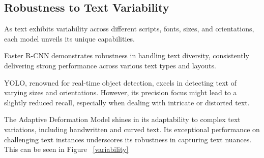 \subsection{Robustness to Text Variability} 
As text exhibits variability across different scripts, fonts, sizes, and orientations, each model unveils its unique capabilities. 

Faster R-CNN demonstrates robustness in handling text diversity, consistently delivering strong performance across various text types and layouts.


YOLO, renowned for real-time object detection, excels in detecting text of varying sizes and orientations. However, its precision focus might lead to a slightly reduced recall, especially when dealing with intricate or distorted text.


The Adaptive Deformation Model shines in its adaptability to complex text variations, including handwritten and curved text. Its exceptional performance on challenging text instances underscores its robustness in capturing text nuances. This can be seen in Figure ~\ref{variability}


